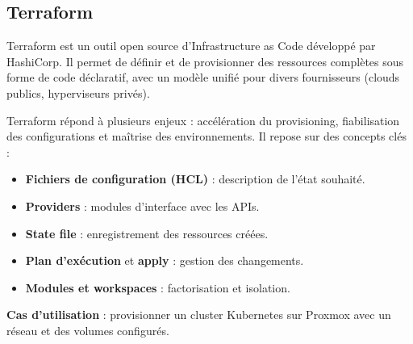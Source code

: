 \subsection{Terraform}

Terraform est un outil open source d’Infrastructure as Code développé par HashiCorp. Il permet de définir et de provisionner des ressources complètes sous forme de code déclaratif, avec un modèle unifié pour divers fournisseurs (clouds publics, hyperviseurs privés).

Terraform répond à plusieurs enjeux : accélération du provisioning, fiabilisation des configurations et maîtrise des environnements. Il repose sur des concepts clés :
\begin{itemize}
	\item \textbf{Fichiers de configuration (HCL)} : description de l’état souhaité.
	\item \textbf{Providers} : modules d’interface avec les APIs.
	\item \textbf{State file} : enregistrement des ressources créées.
	\item \textbf{Plan d’exécution} et \textbf{apply} : gestion des changements.
	\item \textbf{Modules et workspaces} : factorisation et isolation.
\end{itemize}

\textbf{Cas d’utilisation} : provisionner un cluster Kubernetes sur Proxmox avec un réseau et des volumes configurés.





